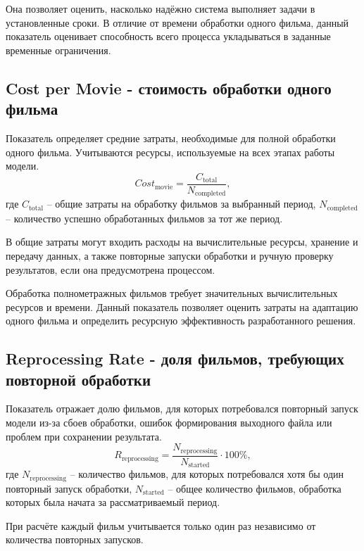 \documentclass[a4paper,14pt]{extarticle}
\begin{document}
    Она позволяет оценить, насколько надёжно система выполняет задачи в установленные сроки. 
    В отличие от времени обработки одного фильма, данный показатель оценивает способность всего процесса укладываться в заданные временные ограничения.

    \subsection{Cost per Movie - стоимость обработки одного фильма}
    Показатель определяет средние затраты, необходимые для полной обработки одного фильма. 
    Учитываются ресурсы, используемые на всех этапах работы модели.
    \begin{equation*}
        \displaystyle Cost_{\text{movie}} = \frac{C_{\text{total}}}{N_{\text{completed}}},
    \end{equation*}
    где $C_{\text{total}}$ -- общие затраты на обработку фильмов за выбранный период, $N_{\text{completed}}$ -- количество успешно обработанных фильмов за тот же период.

    В общие затраты могут входить расходы на вычислительные ресурсы, хранение и передачу данных, а также повторные запуски обработки и ручную проверку результатов, если она предусмотрена процессом.

    Обработка полнометражных фильмов требует значительных вычислительных ресурсов и времени.
    Данный показатель позволяет оценить затраты на адаптацию одного фильма и определить ресурсную эффективность разработанного решения.

    \subsection{Reprocessing Rate - доля фильмов, требующих повторной обработки}

    Показатель отражает долю фильмов, для которых потребовался повторный запуск модели из-за сбоев обработки, ошибок формирования выходного файла или проблем при сохранении результата.
    \begin{equation*}
        \displaystyle R_{\text{reprocessing}} = \frac{N_{\text{reprocessing}}}{N_{\text{started}}} \cdot 100 \%,
    \end{equation*}
    где $N_{\text{reprocessing}}$ -- количество фильмов, для которых потребовался хотя бы один повторный запуск обработки, $N_{\text{started}}$ -- общее количество фильмов, обработка которых была начата за рассматриваемый период.

    При расчёте каждый фильм учитывается только один раз независимо от количества повторных запусков.
\end{document}
